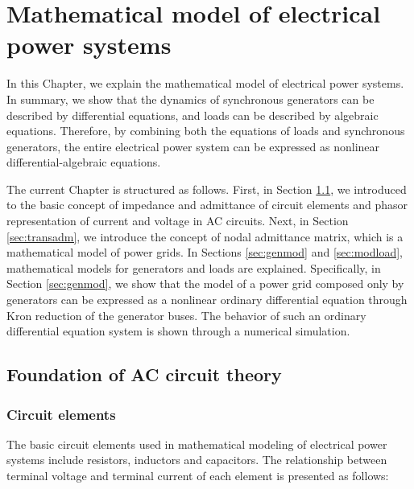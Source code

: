\documentclass[graybox, envcountchap]{svmult}
\begin{document}
\chapter{Mathematical model of electrical power systems}\label{ch:model}

In this Chapter, we explain the mathematical model of electrical power systems.
In summary, we show that the dynamics of synchronous generators can be described
by differential equations, and loads can be described by algebraic equations.
Therefore, by combining both the equations of loads and synchronous generators,
the entire electrical power system can be expressed as nonlinear
differential-algebraic equations.

The current Chapter is structured as follows. First, in Section
\ref{sec:basicele}, we introduced to the basic concept of impedance and
admittance of circuit elements and phasor representation of current and voltage
in AC circuits. Next, in Section \ref{sec:transadm}, we introduce the concept of
nodal admittance matrix, which is a mathematical model of power grids. In
Sections \ref{sec:genmod} and \ref{sec:modload}, mathematical models for
generators and loads are explained. Specifically, in Section \ref{sec:genmod},
we show that the model of a power grid composed only by generators can be
expressed as a nonlinear ordinary differential equation through Kron reduction
of the generator buses. The behavior of such an ordinary differential equation
system is shown through a numerical simulation.

\section{Foundation of AC circuit theory}\label{sec:basicele}

\subsection{Circuit elements}

The basic circuit elements used in mathematical modeling of electrical power
systems include resistors, inductors and capacitors. The relationship between
terminal voltage and terminal current of each element is presented as follows: 
\end{document}
